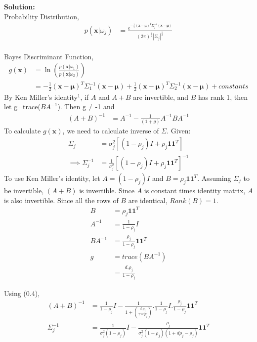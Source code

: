 \documentclass[12pt]{article}
\numberwithin{equation}{section}
\numberwithin{figure}{section}
\numberwithin{table}{section}
\renewcommand{\vec}[1]{\mathbf{#1}}
\begin{document}
\bigskip
{\bf Solution:}
\bigskip
\\
Probability Distribution,
\begin{align}
p(\vec{x}|\omega_{j}) & = 
\frac{e^{-\frac{1}{2}(\vec{x}-\vec{\mu})^{T}\varSigma_{j}^{-1}(\vec{x}-\vec{\mu})}}{(2\pi)^{\frac{d}{2}}|\varSigma_{j}|^{\frac{1}{2}}}
\end{align}
\\
Bayes Discriminant Function,
\begin{align}
g(\vec{x}) & = \ln (\frac{p(\vec{x}|\omega_{1})}{p(\vec{x}|\omega_{2})})\\
& = -\frac{1}{2}(\vec{x}-\vec{\mu})^{T}\varSigma^{-1}_{1}(\vec{x}-\vec{\mu}) + \frac{1}{2}(\vec{x}-\vec{\mu})^{T}\varSigma^{-1}_{2}(\vec{x}-\vec{\mu}) + constants
\end{align}
\newpage
\normalsize
By Ken Miller's identity$^{1}$, if $A$ and $A+B$ are invertible, and $B$ has rank 1, then let g=trace($BA^{-1}$). Then g$\neq$-1 and
\begin{align}
(A+B)^{-1} &=  A^{-1} - \frac{1}{(1+g)} A^{-1}BA^{-1}
\end{align}
To calculate $g(\vec{x})$, we need to calculate inverse of $\varSigma$. Given:
\begin{align}
\varSigma_{j} &= \sigma^{2}_{j}[(1 - \rho_{j})I + \rho_{j}\vec{1}\vec{1}^{T}]\\
\implies \varSigma_{j}^{-1} &= \frac{1}{\sigma^{2}_{j}}[(1 - \rho_{j})I + \rho_{j}\vec{1}\vec{1}^{T}]^{-1}
\end{align}
To use Ken Miller's identity, let $A = (1-\rho_{j})I$ and $B = \rho_{j}\vec{1}\vec{1}^{T}$.
Assuming $\varSigma_{j}$ to be invertible, $(A+B)$ is invertible. Since $A$ is constant times identity matrix, $A$ is also invertible.
Since all the rows of $B$ are identical, $Rank(B) = 1$.
\begin{align}
B &= \rho_{j}\vec{1}\vec{1}^{T}\\
A^{-1} &= \frac{1}{1-\rho_{j}}I\\
BA^{-1} &= \frac{\rho_{j}}{1-\rho_{j}}\vec{1}\vec{1}^{T}\\
g &= trace(BA^{-1})\\
&= \frac{d . \rho_{j}}{1-\rho_{j}}
\end{align}

Using (0.4),
\begin{align}
(A+B)^{-1} &= \frac{1}{1-\rho_{j}}I - \frac{1}{1+(\frac{d . \rho_{j}}{1-\rho_{j}})}.\frac{1}{1-\rho_{j}}I.\frac{\rho_{j}}{1-\rho_{j}}\vec{1}\vec{1}^{T}\\
\varSigma_{j}^{-1} &= \frac{1}{\sigma_{j}^{2}(1-\rho_{j})}I - \frac{\rho_{j}}{\sigma_{j}^{2}(1-\rho_{j})(1+d\rho_{j}-\rho_{j})}\vec{1}\vec{1}^{T}
\end{align}
\end{document}
